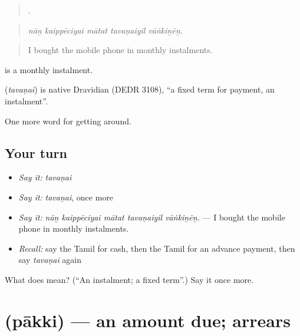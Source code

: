 \begin{quote}
    .
\end{quote}

\begin{quote}
\emph{nāṉ kaippēciyai mātat tavaṇaiyil vāṅkiṉēṉ.}
\end{quote}

\begin{quote}
I bought the mobile phone in monthly instalments.
\end{quote}

  is a monthly instalment.

\begin{cousinweb}
\textbf{} (\emph{tavaṇai}) is native Dravidian (DEDR 3108), \textquotedblleft{}a fixed term for payment, an instalment\textquotedblright{}.
\end{cousinweb}

\begin{grammarlens}[title={What you've built}]
One more word for getting around.
\end{grammarlens}

\subsection*{Your turn}
\begin{itemize}
\raggedright
  \item \emph{Say it:} \emph{tavaṇai}
  \item \emph{Say it:} \emph{tavaṇai}, once more
  \item \emph{Say it:} \emph{nāṉ kaippēciyai mātat tavaṇaiyil vāṅkiṉēṉ.} — I bought the mobile phone in monthly instalments.
  \item \emph{Recall:} say the Tamil for cash, then the Tamil for an advance payment, then say \emph{tavaṇai} again
\end{itemize}

\begin{tcolorbox}[breakable,colback=teal!4,colframe=teal!35!black,title={Before you move on}]
What does  mean? (\textquotedblleft{}An instalment; a fixed term\textquotedblright{}.) Say it once more.
\end{tcolorbox}
\section[\texorpdfstring{\ta{பாக்கி} (pākki)}{பாக்கி (pākki)}]{ (pākki) — an amount due; arrears}

